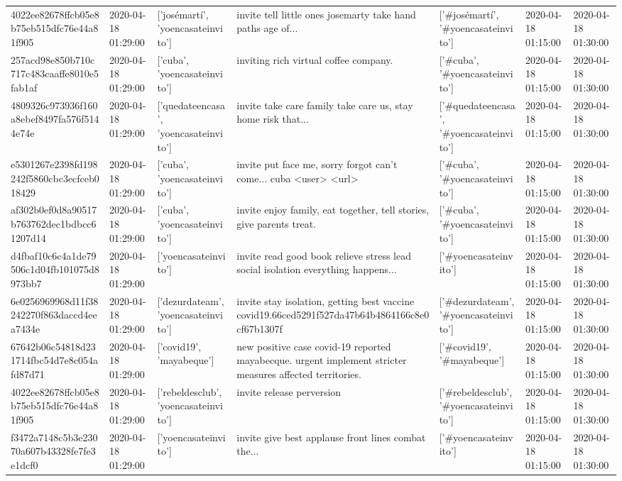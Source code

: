 \begin{tabular}{lllllll}
4022ee82678ffcb05e8b75eb515dfc76e44a81f905 & 2020-04-18 01:29:00 & ['josémartí', 'yoencasateinvito'] & invite tell little ones josemarty take hand paths age of... & ['#josémartí', '#yoencasateinvito'] & 2020-04-18 01:15:00 & 2020-04-18 01:30:00 \\
257acd98e850b710c717c483caaffe8010e5fab1af & 2020-04-18 01:29:00 & ['cuba', 'yoencasateinvito'] & inviting rich virtual coffee company. & ['#cuba', '#yoencasateinvito'] & 2020-04-18 01:15:00 & 2020-04-18 01:30:00 \\
4809326c973936f160a8ebef8497fa576f5144e74e & 2020-04-18 01:29:00 & ['quedateencasa', 'yoencasateinvito'] & invite take care family take care us, stay home risk that... & ['#quedateencasa', '#yoencasateinvito'] & 2020-04-18 01:15:00 & 2020-04-18 01:30:00 \\
e5301267e2398fd198242f5860cbc3ecfceb018429 & 2020-04-18 01:29:00 & ['cuba', 'yoencasateinvito'] & invite put face me, sorry forgot can't come... cuba <user> <url> & ['#cuba', '#yoencasateinvito'] & 2020-04-18 01:15:00 & 2020-04-18 01:30:00 \\
af302b0ef0d8a90517b763762dec1bdbcc61207d14 & 2020-04-18 01:29:00 & ['cuba', 'yoencasateinvito'] & invite enjoy family, eat together, tell stories, give parents treat. & ['#cuba', '#yoencasateinvito'] & 2020-04-18 01:15:00 & 2020-04-18 01:30:00 \\
d4fbaf10c6c4a1de79506c1d04fb101075d8973bb7 & 2020-04-18 01:29:00 & ['yoencasateinvito'] & invite read good book relieve stress lead social isolation everything happens... & ['#yoencasateinvito'] & 2020-04-18 01:15:00 & 2020-04-18 01:30:00 \\
6e0256969968d11f38242270f863daccd4eea7434e & 2020-04-18 01:29:00 & ['dezurdateam', 'yoencasateinvito'] & invite stay isolation, getting best vaccine covid19.66ced5291f527da47b64b4864166c8e0cf67b1307f & ['#dezurdateam', '#yoencasateinvito'] & 2020-04-18 01:15:00 & 2020-04-18 01:30:00 \\
67642b06c54818d231714fbc54d7e8c054afd87d71 & 2020-04-18 01:29:00 & ['covid19', 'mayabeque'] & new positive case covid-19 reported mayabecque. urgent implement stricter measures affected territories. & ['#covid19', '#mayabeque'] & 2020-04-18 01:15:00 & 2020-04-18 01:30:00 \\
4022ee82678ffcb05e8b75eb515dfc76e44a81f905 & 2020-04-18 01:29:00 & ['rebeldesclub', 'yoencasateinvito'] & invite release perversion & ['#rebeldesclub', '#yoencasateinvito'] & 2020-04-18 01:15:00 & 2020-04-18 01:30:00 \\
f3472a7148c5b3e23070a607b43328fe7fe3e1dcf0 & 2020-04-18 01:29:00 & ['yoencasateinvito'] & invite give best applause front lines combat the... & ['#yoencasateinvito'] & 2020-04-18 01:15:00 & 2020-04-18 01:30:00 \\

\end{tabular}

